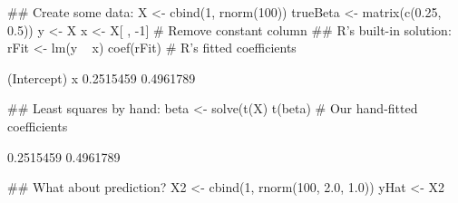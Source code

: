 \begin{Schunk}
\begin{Sinput}
 ## Create some data:
 X <- cbind(1, rnorm(100))
 trueBeta <- matrix(c(0.25, 0.5))
 y <- X %*% trueBeta + rnorm(100, 0.0, 0.1)
 x <- X[ , -1] # Remove constant column
 ## R's built-in solution:
 rFit <- lm(y ~ x)
 coef(rFit) # R's fitted coefficients
\end{Sinput}
\begin{Soutput}
(Intercept)           x 
  0.2515459   0.4961789 
\end{Soutput}
\begin{Sinput}
 ## Least squares by hand:
 beta <- solve(t(X) %*% X) %*% t(X) %*% y
 t(beta) # Our hand-fitted coefficients
\end{Sinput}
\begin{Soutput}
          [,1]      [,2]
[1,] 0.2515459 0.4961789
\end{Soutput}
\begin{Sinput}
 ## What about prediction?
 X2 <- cbind(1, rnorm(100, 2.0, 1.0))
 yHat <- X2 %*% beta
\end{Sinput}
\end{Schunk}

